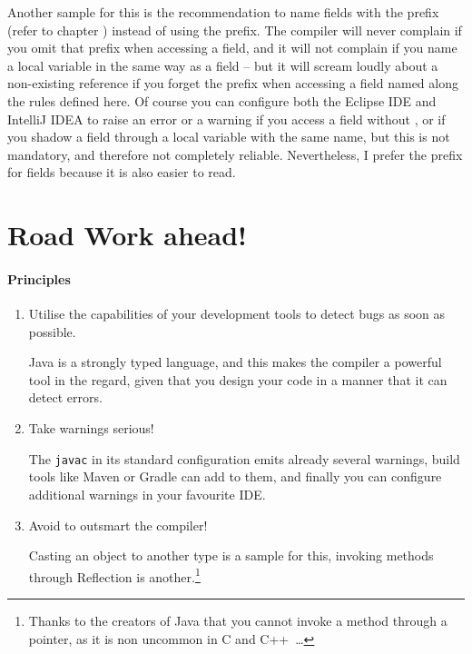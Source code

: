 Another sample for this is the recommendation to name fields with the  prefix (refer to chapter ) instead of using the  prefix. The compiler will never complain if you omit that prefix when accessing a field, and it will not complain if you name a local variable in the same way as a field – but it will scream loudly about a non-existing reference if you forget the  prefix when accessing a field named along the rules defined here. Of course you can configure both the Eclipse IDE and IntelliJ IDEA to raise an error or a warning if you access a field without , or if you shadow a field through a local variable with the same name, but this is not mandatory, and therefore not completely reliable. Nevertheless, I prefer the  prefix for fields because it is also easier to read.

\chapter*{Road Work ahead!}

\subsubsection{Principles}
\begin{enumerate}[label=P\arabic*.]
\item{Utilise the capabilities of your development tools to detect bugs as soon as possible.

Java is a strongly typed language, and this makes the compiler a powerful tool in the regard, given that you design your code in a manner that it can detect errors.}

\item{Take warnings serious!

The \verb#javac# in its standard configuration emits already several warnings, build tools like Maven\autocite{APACHE_MAVEN} or Gradle\autocite{GRADLE} can add to them, and finally you can configure additional warnings in your favourite IDE.}

\item{Avoid to outsmart the compiler!

Casting an object to another type is a sample for this, invoking methods through Reflection is another.\footnote{Thanks to the creators of Java that you cannot invoke a method through a pointer, as it is non uncommon in C and C++~…}}
\end{enumerate}



